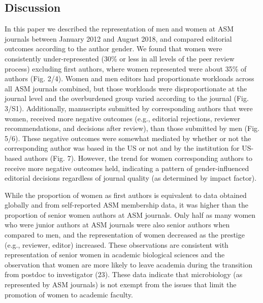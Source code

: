 \documentclass[11pt,]{article}
\begin{document}
\subsection{Discussion}\label{discussion}

In this paper we described the representation of men and women at ASM
journals between January 2012 and August 2018, and compared editorial
outcomes according to the author gender. We found that women were
consistently under-represented (30\% or less in all levels of the peer
review process) excluding first authors, where women represented were
about 35\% of authors (Fig. 2/4). Women and men editors had
proportionate workloads across all ASM journals combined, but those
workloads were disproportionate at the journal level and the
overburdened group varied according to the journal (Fig. 3/S1).
Additionally, manuscripts submitted by corresponding authors that were
women, received more negative outcomes (e.g., editorial rejections,
reviewer recommendations, and decisions after review), than those
submitted by men (Fig. 5/6). These negative outcomes were somewhat
mediated by whether or not the corresponding author was based in the US
or not and by the institution for US-based authors (Fig. 7). However,
the trend for women corresponding authors to receive more negative
outcomes held, indicating a pattern of gender-influenced editorial
decisions regardless of journal quality (as determined by impact
factor).

While the proportion of women as first authors is equivalent to data
obtained globally and from self-reported ASM membership data, it was
higher than the proportion of senior women authors at ASM journals. Only
half as many women who were junior authors at ASM journals were also
senior authors when compared to men, and the representation of women
decreased as the prestige (e.g., reviewer, editor) increased. These
observations are consistent with representation of senior women in
academic biological sciences and the observation that women are more
likely to leave academia during the transition from postdoc to
investigator (23). These data indicate that microbiology (as represented
by ASM journals) is not exempt from the issues that limit the promotion
of women to academic faculty.
\end{document}
